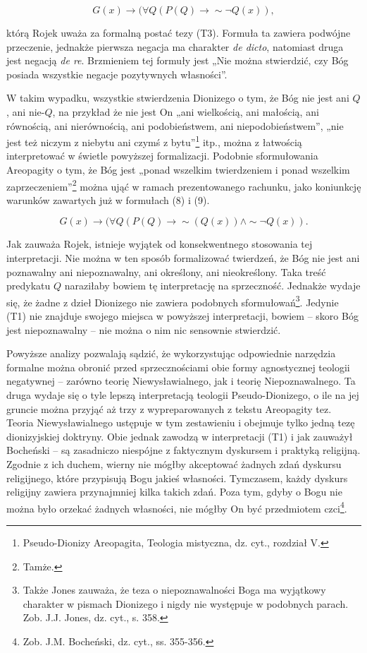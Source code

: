 \begin{equation}
    G(x) \to  (\forall Q (P(Q) \to
\sim\!\neg Q(x)),
\end{equation}


którą Rojek uważa za formalną postać tezy (T3). Formuła ta zawiera
podwójne przeczenie, jednakże pierwsza negacja ma charakter \textit{de
dicto}, natomiast druga jest negacją \textit{de re}. Brzmieniem tej
formuły jest „Nie można stwierdzić, czy Bóg posiada wszystkie negacje
pozytywnych własności”.

W takim wypadku, wszystkie stwierdzenia Dionizego o tym, że Bóg nie jest
ani $Q$, ani nie-$Q$, na przykład że nie jest On „ani wielkością, ani
małością, ani równością, ani nierównością, ani podobieństwem, ani
niepodobieństwem”, „nie jest też niczym z niebytu ani czymś z
bytu”\footnote{Pseudo-Dionizy Areopagita, Teologia mistyczna, dz.
cyt., rozdział V. } itp.,  można z łatwością interpretować w
świetle powyższej formalizacji. Podobnie sformułowania Areopagity o
tym, że Bóg jest „ponad wszelkim twierdzeniem i ponad wszelkim
zaprzeczeniem”\footnote{Tamże. } można ująć w ramach
prezentowanego rachunku, jako koniunkcję warunków zawartych już w
formułach (8) i (9).


\begin{equation}
    G(x) \to  (\forall Q (P(Q) \to  \sim\!(Q(x)) \land
\sim\!\neg Q(x)).
\end{equation}



Jak zauważa Rojek, istnieje wyjątek od konsekwentnego stosowania tej
interpretacji. Nie można w ten sposób formalizować  twierdzeń, że Bóg
nie jest ani poznawalny ani niepoznawalny, ani określony, ani
nieokreślony. Taka treść predykatu $Q$ naraziłaby bowiem tę interpretację
na sprzeczność. Jednakże wydaje się, że żadne z dzieł Dionizego nie
zawiera podobnych sformułowań\footnote{Także Jones zauważa, że teza o
niepoznawalności Boga ma wyjątkowy charakter w pismach Dionizego i
nigdy nie występuje w podobnych parach. Zob. J.J. Jones, dz. cyt., s.
358. }. Jedynie (T1) nie znajduje swojego miejsca w powyższej
interpretacji, bowiem -- skoro Bóg jest niepoznawalny -- nie można o nim
nic sensownie stwierdzić.

Powyższe analizy pozwalają sądzić, że wykorzystując odpowiednie
narzędzia formalne można obronić przed sprzecznościami obie formy
agnostycznej teologii negatywnej -- zarówno teorię Niewysławialnego, jak
i teorię Niepoznawalnego. Ta druga wydaje się o tyle lepszą
interpretacją teologii Pseudo-Dionizego, o ile na jej gruncie można
przyjąć aż trzy z wypreparowanych z tekstu Areopagity tez. Teoria
Niewysławialnego ustępuje w tym zestawieniu  i obejmuje tylko jedną
tezę dionizyjskiej doktryny. Obie jednak zawodzą w interpretacji (T1) i
jak zauważył Bocheński -- są zasadniczo niespójne z faktycznym dyskursem
i praktyką religijną. Zgodnie z ich duchem, wierny nie mógłby
akceptować żadnych zdań dyskursu religijnego, które przypisują Bogu
jakieś własności. Tymczasem, każdy dyskurs religijny zawiera
przynajmniej kilka takich zdań. Poza tym, gdyby o Bogu nie można było
orzekać żadnych własności, nie mógłby On być przedmiotem czci\footnote{
Zob. J.M. Bocheński, dz. cyt., ss. 355-356.}.




